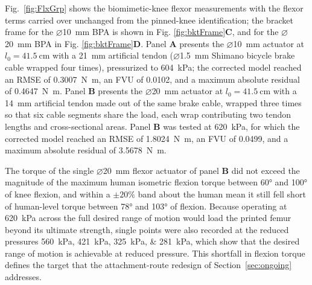Fig.~\ref{fig:FlxGrp} shows the biomimetic-knee flexor measurements with the flexor terms carried over unchanged from the pinned-knee identification; the bracket frame for the $\diameter$\qty{10}{\mm} BPA is shown in Fig. \ref{fig:bktFrame}\textbf{C}, and for the $\diameter$\qty{20}{\mm} BPA in Fig. \ref{fig:bktFrame}\textbf{D}. Panel \textbf{A} presents the $\diameter$\qty{10}{\mm} actuator at $l_{0}=\qty{41.5}{\cm}$ with a \qty{21}{\mm} artificial tendon ($\diameter$\qty{1.5}{\mm} Shimano bicycle brake cable wrapped four times), pressurized to \qty{604}{\kPa}; the corrected model reached an RMSE of \qty{0.3007}{\newton\meter}, an FVU of 0.0102, and a maximum absolute residual of \qty{0.4647}{\newton\meter}. Panel \textbf{B} presents the $\diameter$\qty{20}{\mm} actuator at $l_{0}=\qty{41.5}{\cm}$ with a \qty{14}{\mm} artificial tendon made out of the same brake cable, wrapped three times so that six cable segments share the load, each wrap contributing two tendon lengths and cross-sectional areas. Panel \textbf{B} was tested at \qty{620}{\kPa}, for which the corrected model reached an RMSE of \qty{1.8024}{\newton\meter}, an FVU of 0.0499, and a maximum absolute residual of \qty{3.5678}{\newton\meter}.

The torque of the single $\diameter$\qty{20}{\mm} flexor actuator of panel \textbf{B} did not exceed the magnitude of the maximum human isometric flexion torque between \ang{60} and \ang{100} of knee flexion, and within a $\pm 20\%$ band about the human mean it still fell short of human-level torque between \ang{78} and \ang{103} of flexion. Because operating at \qty{620}{\kPa} across the full desired range of motion would load the printed femur beyond its ultimate strength, single points were also recorded at the reduced pressures \qtylist{560;421;325;281}{\kPa}, which show that the desired range of motion is achievable at reduced pressure. This shortfall in flexion torque defines the target that the attachment-route redesign of Section~\ref{sec:ongoing} addresses.

